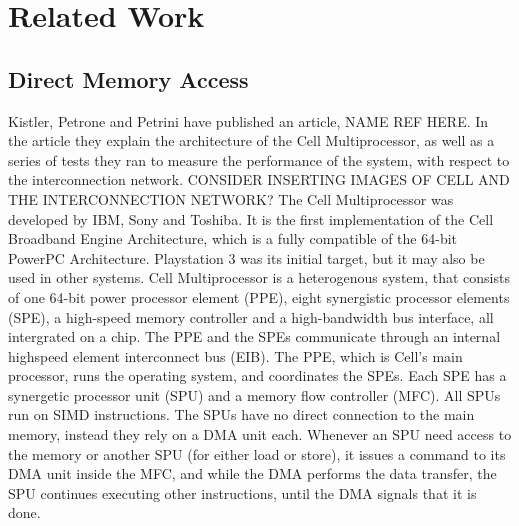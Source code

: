 \chapter{Related Work}

\section{Direct Memory Access}

Kistler, Petrone and Petrini have published an article, NAME REF HERE. 
In the article they explain the architecture of the Cell Multiprocessor, as well as a series of tests they ran to measure the performance of the system, with respect to the interconnection network.
CONSIDER INSERTING IMAGES OF CELL AND THE INTERCONNECTION NETWORK?
The Cell Multiprocessor was developed by IBM, Sony and Toshiba.
It is the first implementation of the Cell Broadband Engine Architecture, which is a fully compatible of the 64-bit PowerPC Architecture.
Playstation 3 was its initial target, but it may also be used in other systems.
Cell Multiprocessor is a heterogenous system, that consists of one 64-bit power processor element (PPE), eight synergistic processor elements (SPE), a high-speed memory controller and a high-bandwidth bus interface, all intergrated on a chip. 
The PPE and the SPEs communicate through an internal highspeed element interconnect bus (EIB).
The PPE, which is Cell's main processor, runs the operating system, and coordinates the SPEs.
Each SPE has a synergetic processor unit (SPU) and a memory flow controller (MFC).
All SPUs run on SIMD instructions.
The SPUs have no direct connection to the main memory, instead they rely on a DMA unit each.
Whenever an SPU need access to the memory or another SPU (for either load or store), it issues a command to its DMA unit inside the MFC, and while the DMA performs the data transfer, the SPU continues executing other instructions, until the DMA signals that it is done.
